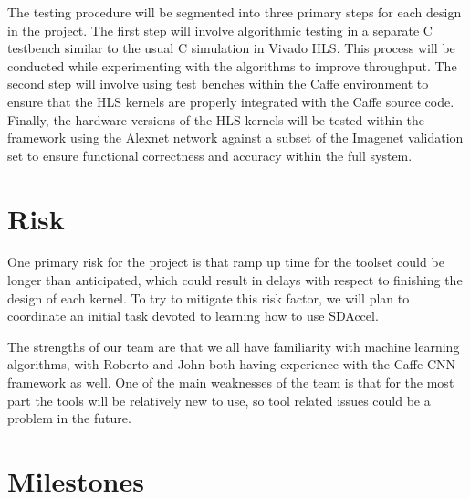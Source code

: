 \documentclass[conference,compsoc]{IEEEtran/IEEEtran}
\begin{document}
The testing procedure will be segmented into three primary steps for each design in the project.
The first step will involve algorithmic testing in a separate C testbench similar to the usual C
simulation in Vivado HLS. This process will be conducted while experimenting with the algorithms
to improve throughput. The second step will involve using test benches within the Caffe environment
to ensure that the HLS kernels are properly integrated with the Caffe source code. Finally, the
hardware versions of the HLS kernels will be tested within the framework using the Alexnet network
against a subset of the Imagenet validation set to ensure functional correctness and accuracy
within the full system.

\section{Risk}\label{section:risk}

One primary risk for the project is that ramp up time for the toolset could be longer than
anticipated, which could result in delays with respect to finishing the design of each kernel.
To try to mitigate this risk factor, we will plan to coordinate an initial task devoted to
learning how to use SDAccel.

The strengths of our team are that we all have familiarity with machine learning algorithms,
with Roberto and John both having experience with the Caffe CNN framework as well. One of the
main weaknesses of the team is that for the most part the tools will be relatively new to use,
so tool related issues could be a problem in the future.

\section{Milestones}\label{section:milestones}
\end{document}
